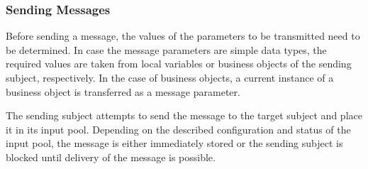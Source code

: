 \subsubsection{Sending Messages}

Before sending a message, the values of the parameters to be transmitted need to be determined. In case the message parameters are simple data types, the required values are taken from local variables or business objects of the sending subject, respectively. In the case of business objects, a current instance of a business object is transferred as a message parameter.

The sending subject attempts to send the message to the target subject and place it in its input pool. Depending on the described configuration and status of the input pool, the message is either immediately stored or the sending subject is blocked until delivery of the message is possible.





